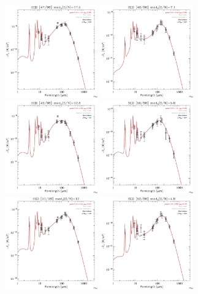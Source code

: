 \documentclass[preprint2,longabstract]{aastex}
\begin{document}
\begin{figure}
    \includegraphics[trim=0 2mm 0 0, clip, width=40mm]{SEDs/sed_47.pdf}
	\includegraphics[trim=0 2mm 0 0, clip, width=40mm]{SEDs/sed_48.pdf}
	\includegraphics[trim=0 2mm 0 0, clip, width=40mm]{SEDs/sed_49.pdf}
	\includegraphics[trim=0 2mm 0 0, clip, width=40mm]{SEDs/sed_50.pdf}
	\includegraphics[trim=0 2mm 0 0, clip, width=40mm]{SEDs/sed_51.pdf}
	\includegraphics[trim=0 2mm 0 0, clip, width=40mm]{SEDs/sed_52.pdf}

\end{figure}
\end{document}

